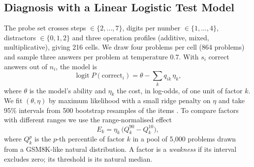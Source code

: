 \documentclass[11pt]{article}
\begin{document}
\subsection{Diagnosis with a Linear Logistic Test Model}
The probe set crosses steps $\in\{2,\dots,7\}$, digits per number $\in\{1,\dots,4\}$, distractors $\in\{0,1,2\}$ and
three operation profiles (additive, mixed, multiplicative), giving 216 cells. We draw four problems per cell (864
problems) and sample three answers per problem at temperature 0.7. With $s_i$ correct answers out of $n_i$, the model
is
\begin{equation}
  \operatorname{logit} P(\text{correct}_i) = \theta - \sum_k q_{ik}\,\eta_k ,
  \label{eq:lltm}
\end{equation}
where $\theta$ is the model's ability and $\eta_k$ the cost, in log-odds, of one unit of factor $k$. We fit
$(\theta,\eta)$ by maximum likelihood with a small ridge penalty on $\eta$ and take 95\% intervals from 500 bootstrap
resamples of the items \citep{efron1993bootstrap}. To compare factors with different ranges we use the range-normalised
effect
\begin{equation}
  E_k = \eta_k\,\bigl(Q_k^{90} - Q_k^{10}\bigr),
\end{equation}
where $Q_k^{p}$ is the $p$-th percentile of factor $k$ in a pool of 5{,}000 problems drawn from a GSM8K-like natural
distribution. A factor is a \emph{weakness} if its interval excludes zero; its threshold is its natural median.
\end{document}
